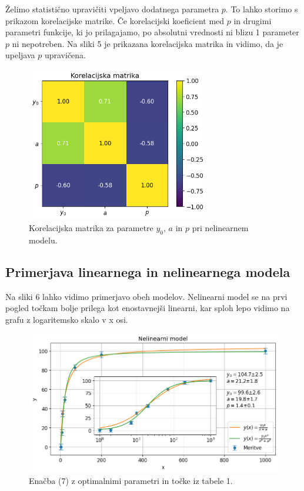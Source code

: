 \documentclass[slovene,11pt,a4paper]{article}
\begin{document}
Želimo statistično upravičiti vpeljavo dodatnega parametra $p$. To lahko storimo s prikazom korelacijske matrike. Če korelacijski koeficient med $p$ in drugimi parametri funkcije, ki jo prilagajamo, po absolutni vrednosti ni blizu 1 parameter $p$ ni nepotreben. Na sliki 5 je prikazana korelacijska matrika in vidimo, da je upeljava $p$ upravičena.

\begin{figure}[h!]
\centering
\includegraphics[width=8cm]{farma5.png}
\caption{Korelacijska matrika za parametre $y_0$, $a$ in $p$ pri nelinearnem modelu.}
\end{figure}

\subsection{Primerjava linearnega in nelinearnega modela}

Na sliki 6 lahko vidimo primerjavo obeh modelov. Nelinearni model se na prvi pogled točkam bolje prilega kot enostavnejši linearni, kar sploh lepo vidimo na grafu z logaritemsko skalo v x osi.

\begin{figure}[h!]
\centering
\includegraphics[width=13cm]{farma6.png}
\caption{Enačba (7) z optimalnimi parametri in točke iz tabele 1.}
\end{figure}
\end{document}
